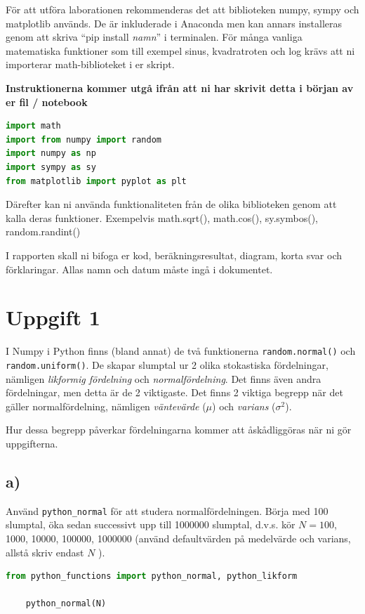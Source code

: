 \documentclass[a4paper]{article}
\begin{document}
För att utföra laborationen rekommenderas det att biblioteken numpy,
sympy och matplotlib används. De är inkluderade i Anaconda men kan annars installeras genom att
skriva ``pip install \textit{namn}'' i terminalen. För många vanliga matematiska funktioner som till 
exempel sinus, kvadratroten och log krävs att ni importerar math-biblioteket i er skript.

\textbf{Instruktionerna kommer utgå ifrån att ni har skrivit detta i början av er fil / notebook}
\begin{lstlisting}[language=Python] import math
import from numpy import random
import numpy as np
import sympy as sy
from matplotlib import pyplot as plt
\end{lstlisting}

Därefter kan ni använda funktionaliteten från de olika biblioteken genom att
kalla deras funktioner. Exempelvis math.sqrt(), math.cos(), sy.symbos(), random.randint()

I rapporten skall ni bifoga er kod, beräkningsresultat, diagram, korta svar och förklaringar.
Allas namn och datum måste ingå i dokumentet.

\newpage
\section{Uppgift 1}
I Numpy i Python finns (bland annat) de två funktionerna \lstinline{random.normal()} och \lstinline{random.uniform()}. 
De skapar slumptal ur 2 olika stokastiska fördelningar, nämligen \textit{likformig fördelning} och \textit{normalfördelning}.
Det finns även andra fördelningar, men detta är de 2 viktigaste. Det finns 2 viktiga begrepp när det gäller 
normalfördelning, nämligen \textit{väntevärde} (\(\mu\)) och \textit{varians} (\(\sigma^2\)). 

Hur dessa begrepp påverkar fördelningarna kommer att åskådliggöras när ni gör uppgifterna.

\subsection{a)}
Använd \lstinline{python_normal} för att studera normalfördelningen. Börja med 100 slumptal,
öka sedan successivt upp till 1000000 slumptal, d.v.s. kör \( N=100 \), 1000, 10000,
100000, 1000000 (använd defaultvärden på medelvärde och varians, allstå skriv endast \( N \) ). 


\begin{lstlisting}[language=Python]
    from python_functions import python_normal, python_likform
    
    python_normal(N)
\end{lstlisting}
\end{document}
